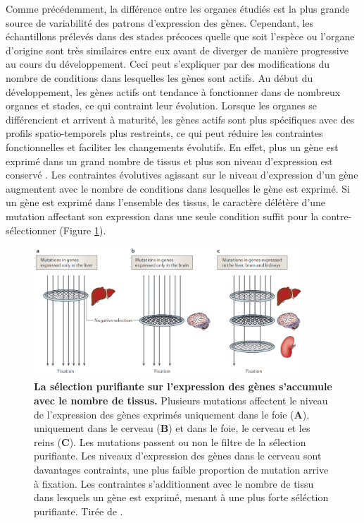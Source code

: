 Comme précédemment, la différence entre les organes étudiés est la plus grande source de variabilité des patrons d’expression des gènes. Cependant, les échantillons prélevés dans des stades précoces quelle que soit l’espèce ou l’organe d’origine sont très similaires entre eux avant de diverger de manière progressive au cours du développement. Ceci peut s’expliquer par des modifications du nombre de \glspl{condition} dans lesquelles les gènes sont actifs. Au début du développement, les gènes actifs ont tendance à fonctionner dans de nombreux organes et stades, ce qui contraint leur évolution. Lorsque les organes se différencient et arrivent à maturité, les gènes actifs sont plus spécifiques avec des profils spatio-temporels plus restreints, ce qui peut réduire les contraintes fonctionnelles et faciliter les changements évolutifs. En effet, plus un gène est exprimé dans un grand nombre de tissus et plus son niveau d’expression est conservé \citep{khaitovich_evolution_2006}. Les contraintes évolutives agissant sur le niveau d’expression d’un gène augmentent avec le nombre de \glspl{condition} dans lesquelles le gène est exprimé. Si un gène est exprimé dans l’ensemble des tissus, le caractère délétère d’une mutation affectant son expression dans une seule \gls{condition} suffit pour la contre-sélectionner (Figure \ref{fig:Fig30}).

\begin{figure}[h]
    \centering
    \includegraphics[width=0.9\textwidth, page=1] {figures/introduction/fig30.png}
    \caption[La sélection purifiante sur l'expression des gènes s'accumule avec le nombre de tissus.]{
    \textbf{La sélection purifiante sur l'expression des gènes s'accumule avec le nombre de tissus.}
    Plusieurs mutations affectent le niveau de l'expression des gènes exprimés uniquement dans le foie (\textbf{A}), uniquement dans le cerveau (\textbf{B}) et dans le foie, le cerveau et les reins (\textbf{C}). Les mutations  passent ou non le filtre de la sélection purifiante. Les niveaux d'expression des gènes dans le cerveau sont davantages contraints, une plus faible proportion de mutation arrive à fixation. Les contraintes s'additionnent avec le nombre de tissu dans lesquels un gène est exprimé, menant à une plus forte séléction purifiante. Tirée de \citep{khaitovich_evolution_2006}.\\
    }
    \label{fig:Fig30}
\end{figure}

